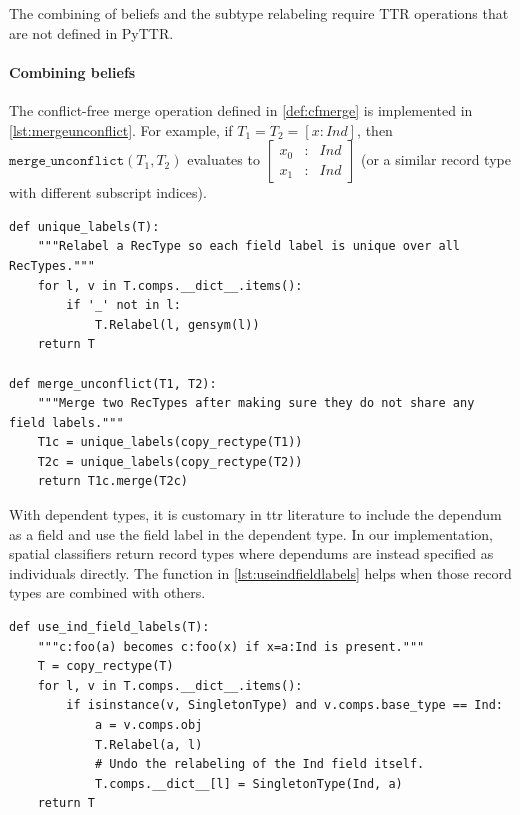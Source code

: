 The combining of beliefs and the subtype relabeling require TTR operations that are not defined in PyTTR.

\paragraph{Combining beliefs}

The conflict-free merge operation defined in \autoref{def:cfmerge} is implemented in \autoref{lst:mergeunconflict}.
For example, if $T_1 = T_2 = [x:Ind]$, then $\mathtt{merge\_unconflict}(T_1, T_2)$ evaluates to $\left[\begin{array}{rcl} x_0&:&Ind \\ x_1&:&Ind \end{array}\right]$ (or a similar record type with different subscript indices).

\begin{lstlisting}[label={lst:mergeunconflict},caption={merge\_unconflict}]
def unique_labels(T):
    """Relabel a RecType so each field label is unique over all RecTypes."""
    for l, v in T.comps.__dict__.items():
        if '_' not in l:
            T.Relabel(l, gensym(l))
    return T

def merge_unconflict(T1, T2):
    """Merge two RecTypes after making sure they do not share any field labels."""
    T1c = unique_labels(copy_rectype(T1))
    T2c = unique_labels(copy_rectype(T2))
    return T1c.merge(T2c)
\end{lstlisting}

With dependent types, it is customary in \gls{ttr} literature to include the dependum as a field and use the field label in the dependent type.
In our implementation, spatial classifiers return record types where dependums are instead specified as individuals directly.
The function in \autoref{lst:useindfieldlabels} helps when those record types are combined with others.

\begin{lstlisting}[label={lst:useindfieldlabels},caption={use\_ind\_field\_labels}]
def use_ind_field_labels(T):
    """c:foo(a) becomes c:foo(x) if x=a:Ind is present."""
    T = copy_rectype(T)
    for l, v in T.comps.__dict__.items():
        if isinstance(v, SingletonType) and v.comps.base_type == Ind:
            a = v.comps.obj
            T.Relabel(a, l)
            # Undo the relabeling of the Ind field itself.
            T.comps.__dict__[l] = SingletonType(Ind, a)
    return T
\end{lstlisting}


